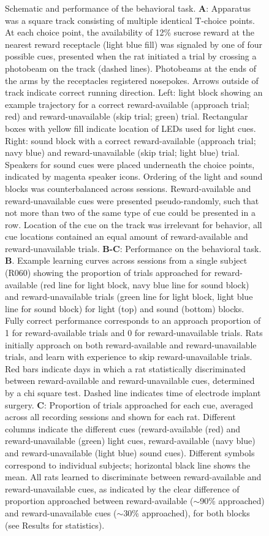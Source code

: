 \documentclass[11pt]{article}
\newcommand{\bsf}[1]{\textbf{#1}}
\begin{document}
\begin{figure}[ht!]
\caption{Schematic and performance of the behavioral task. \bsf{A}: Apparatus was a square track consisting of multiple identical T-choice points. At each choice point, the availability of 12\% sucrose reward at the nearest reward receptacle (light blue fill) was signaled by one of four possible cues, presented when the rat initiated a trial by crossing a photobeam on the track (dashed lines). Photobeams at the ends of the arms by the receptacles registered nosepokes. Arrows outside of track indicate correct running direction. Left: light block showing an example trajectory for a correct reward-available (approach trial; red) and reward-unavailable (skip trial; green) trial. Rectangular boxes with yellow fill indicate location of LEDs used for light cues. Right: sound block with a correct reward-available (approach trial; navy blue) and reward-unavailable (skip trial; light blue) trial. Speakers for sound cues were placed underneath the choice points, indicated by magenta speaker icons. Ordering of the light and sound blocks was counterbalanced across sessions. Reward-available and reward-unavailable cues were presented pseudo-randomly, such that not more than two of the same type of cue could be presented in a row. Location of the cue on the track was irrelevant for behavior, all cue locations contained an equal amount of reward-available and reward-unavailable trials. \bsf{B-C}: Performance on the behavioral task. \bsf{B}. Example learning curves across sessions from a single subject (R060) showing the proportion of trials approached for reward-available (red line for light block, navy blue line for sound block) and reward-unavailable trials (green line for light block, light blue line for sound block) for light (top) and sound (bottom) blocks. Fully correct performance corresponds to an approach proportion of 1 for reward-available trials and 0 for reward-unavailable trials. Rats initially approach on both reward-available and reward-unavailable trials, and learn with experience to skip reward-unavailable trials. Red bars indicate days in which a rat statistically discriminated between reward-available and reward-unavailable cues, determined by a chi square test. Dashed line indicates time of electrode implant surgery. \bsf{C}: Proportion of trials approached for each cue, averaged across all recording sessions and shown for each rat. Different columns indicate the different cues (reward-available (red) and reward-unavailable (green) light cues, reward-available (navy blue) and reward-unavailable (light blue) sound cues). Different symbols correspond to individual subjects; horizontal black line shows the mean. All rats learned to discriminate between reward-available and reward-unavailable cues, as indicated by the clear difference of proportion approached between reward-available ($\sim$90\% approached) and reward-unavailable cues ($\sim$30\% approached), for both blocks (see Results for statistics).}
\label{fig:behav}
\end{figure} \clearpage
\end{document}
